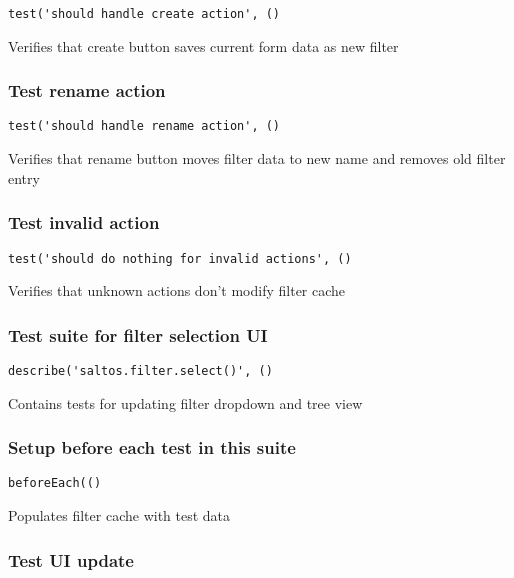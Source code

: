 \documentclass[a4paper]{article}
\begin{document}
\begin{lstlisting}
test('should handle create action', ()
\end{lstlisting}

Verifies that create button saves current form data as new filter

\hypertarget{toc171}{}
\subsubsection{Test rename action}

\begin{lstlisting}
test('should handle rename action', ()
\end{lstlisting}

Verifies that rename button moves filter data to new name
and removes old filter entry

\hypertarget{toc172}{}
\subsubsection{Test invalid action}

\begin{lstlisting}
test('should do nothing for invalid actions', ()
\end{lstlisting}

Verifies that unknown actions don't modify filter cache

\hypertarget{toc173}{}
\subsubsection{Test suite for filter selection UI}

\begin{lstlisting}
describe('saltos.filter.select()', ()
\end{lstlisting}

Contains tests for updating filter dropdown and tree view

\hypertarget{toc174}{}
\subsubsection{Setup before each test in this suite}

\begin{lstlisting}
beforeEach(()
\end{lstlisting}

Populates filter cache with test data

\hypertarget{toc175}{}
\subsubsection{Test UI update}
\end{document}
